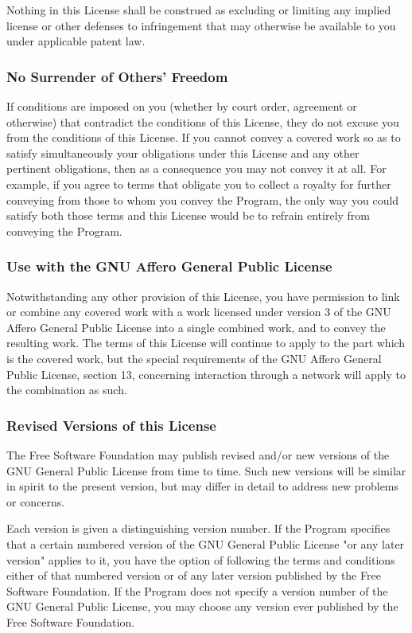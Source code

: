 \documentclass{ctexart}
\begin{document}
  Nothing in this License shall be construed as excluding or limiting
any implied license or other defenses to infringement that may
otherwise be available to you under applicable patent law.

\subsubsection{No Surrender of Others' Freedom}

  If conditions are imposed on you (whether by court order, agreement or
otherwise) that contradict the conditions of this License, they do not
excuse you from the conditions of this License.  If you cannot convey a
covered work so as to satisfy simultaneously your obligations under this
License and any other pertinent obligations, then as a consequence you may
not convey it at all.  For example, if you agree to terms that obligate you
to collect a royalty for further conveying from those to whom you convey
the Program, the only way you could satisfy both those terms and this
License would be to refrain entirely from conveying the Program.

\subsubsection{Use with the GNU Affero General Public License}

  Notwithstanding any other provision of this License, you have
permission to link or combine any covered work with a work licensed
under version 3 of the GNU Affero General Public License into a single
combined work, and to convey the resulting work.  The terms of this
License will continue to apply to the part which is the covered work,
but the special requirements of the GNU Affero General Public License,
section 13, concerning interaction through a network will apply to the
combination as such.

\subsubsection{Revised Versions of this License}

  The Free Software Foundation may publish revised and/or new versions of
the GNU General Public License from time to time.  Such new versions will
be similar in spirit to the present version, but may differ in detail to
address new problems or concerns.

  Each version is given a distinguishing version number.  If the
Program specifies that a certain numbered version of the GNU General
Public License "or any later version" applies to it, you have the
option of following the terms and conditions either of that numbered
version or of any later version published by the Free Software
Foundation.  If the Program does not specify a version number of the
GNU General Public License, you may choose any version ever published
by the Free Software Foundation.
\end{document}
